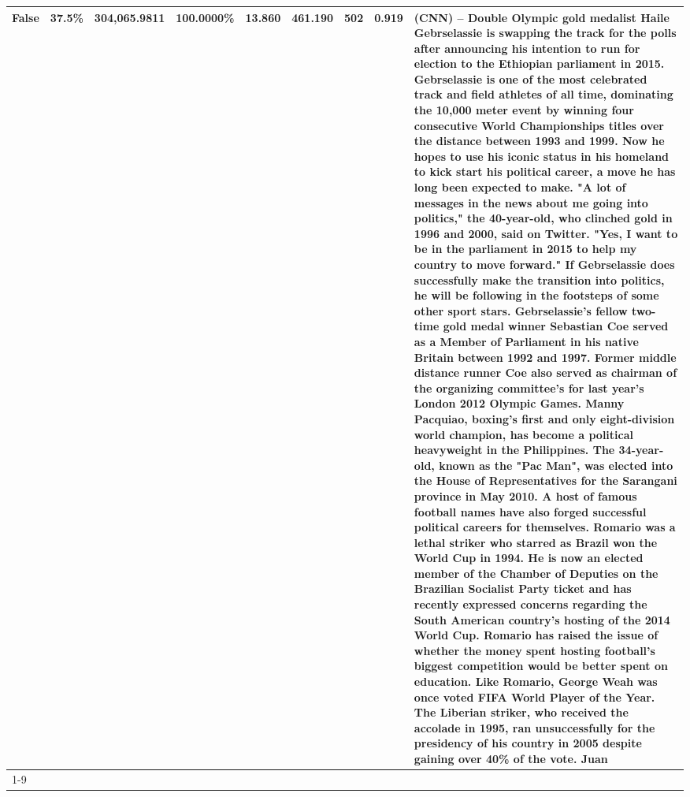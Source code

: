 \begin{table}[H]
{\begin{tabular}{lllrlllll}
False & 37.5\% & 304,065.9811 & \bfseries \color{red} 100.0000\% & 13.860 & 461.190 & 502 & 0.919 & (CNN) -- Double Olympic gold medalist Haile Gebrselassie is swapping the track for the polls after announcing his intention to run for election to the Ethiopian parliament in 2015. Gebrselassie is one of the most celebrated track and field athletes of all time, dominating the 10,000 meter event by winning four consecutive World Championships titles over the distance between 1993 and 1999. Now he hopes to use his iconic status in his homeland to kick start his political career, a move he has long been expected to make. "A lot of messages in the news about me going into politics," the 40-year-old, who clinched gold in 1996 and 2000, said on Twitter. "Yes, I want to be in the parliament in 2015 to help my country to move forward." If Gebrselassie does successfully make the transition into politics, he will be following in the footsteps of some other sport stars. Gebrselassie's fellow two-time gold medal winner Sebastian Coe served as a Member of Parliament in his native Britain between 1992 and 1997. Former middle distance runner Coe also served as chairman of the organizing committee's for last year's London 2012 Olympic Games. Manny Pacquiao, boxing's first and only eight-division world champion, has become a political heavyweight in the Philippines. The 34-year-old, known as the "Pac Man", was elected into the House of Representatives for the Sarangani province in May 2010. A host of famous football names have also forged successful political careers for themselves. Romario was a lethal striker who starred as Brazil won the World Cup in 1994. He is now an elected member of the Chamber of Deputies on the Brazilian Socialist Party ticket and has recently expressed concerns regarding the South American country's hosting of the 2014 World Cup. Romario has raised the issue of whether the money spent hosting football's biggest competition would be better spent on education. Like Romario, George Weah was once voted FIFA World Player of the Year. The Liberian striker, who received the accolade in 1995, ran unsuccessfully for the presidency of his country in 2005 despite gaining over 40\% of the vote. Juan \\
\cline{1-9}

\end{tabular}}
\end{table}
